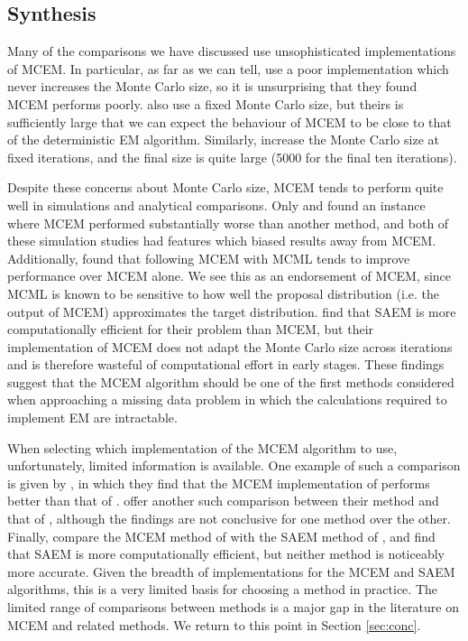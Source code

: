 \documentclass[11pt, oneside]{article}   	%
\begin{document}
\subsection{Synthesis}
Many of the comparisons we have discussed \citep{McC97, Gu98I,Jan03} use unsophisticated implementations of MCEM. In particular, as far as we can tell, \citet{Gu98I} use a poor implementation which never increases the Monte Carlo size, so it is unsurprising that they found MCEM performs poorly. \citet{Jan03} also use a fixed Monte Carlo size, but theirs is sufficiently large that we can expect the behaviour of MCEM to be close to that of the deterministic EM algorithm. Similarly, \citet{McC97} increase the Monte Carlo size at fixed iterations, and the final size is quite large (5000 for the final ten iterations).

Despite these concerns about Monte Carlo size, MCEM tends to perform quite well in simulations and analytical comparisons. Only \citet{Gu98I} and \citet{Boo01} found an instance where MCEM performed substantially worse than another method, and both of these simulation studies had features which biased results away from MCEM. Additionally, \citep{McC97} found that following MCEM with MCML tends to improve performance over MCEM alone. We see this as an endorsement of MCEM, since MCML is known to be sensitive to how well the proposal distribution (i.e. the output of MCEM) approximates the target distribution. \citet{Bae16} find that SAEM is more computationally efficient for their problem than MCEM, but their implementation of MCEM does not adapt the Monte Carlo size across iterations and is therefore wasteful of computational effort in early stages. These findings suggest that the MCEM algorithm should be one of the first methods considered when approaching a missing data problem in which the calculations required to implement EM are intractable.

When selecting which implementation of the MCEM algorithm to use, unfortunately, limited information is available. One example of such a comparison is given by \citet{Tre14}, in which they find that the MCEM implementation of \citet{Caf05} performs better than that of \citet{Wei90}. \citet{Caf05} offer another such comparison between their method and that of \citet{Boo99}, although the findings are not conclusive for one method over the other. Finally, \citet{Bae16} compare the MCEM method of \citet{McC89} with the SAEM method of \citet{Del99}, and find that SAEM is more computationally efficient, but neither method is noticeably more accurate. Given the breadth of implementations for the MCEM and SAEM algorithms, this is a very limited basis for choosing a method in practice. The limited range of comparisons between methods is a major gap in the literature on MCEM and related methods. We return to this point in Section \ref{sec:conc}.
\end{document}
